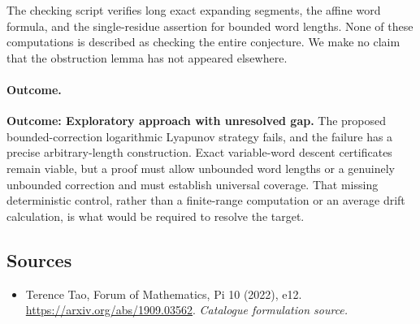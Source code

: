 \documentclass[11pt,a4paper]{article}
\numberwithin{equation}{section}
\begin{document}
The checking script verifies long exact expanding segments, the affine word formula, and the single-residue assertion for bounded word lengths. None of these computations is described as checking the entire conjecture. We make no claim that the obstruction lemma has not appeared elsewhere.

\paragraph{Outcome.}
\textbf{Outcome: Exploratory approach with unresolved gap.}
The proposed bounded-correction logarithmic Lyapunov strategy fails, and the failure has a precise arbitrary-length construction. Exact variable-word descent certificates remain viable, but a proof must allow unbounded word lengths or a genuinely unbounded correction and must establish universal coverage. That missing deterministic control, rather than a finite-range computation or an average drift calculation, is what would be required to resolve the target.

\subsection{Sources}
\begin{itemize}\raggedright
\item[\textnormal{[S1]}]\hypertarget{source:statement:1}{} Terence Tao, Forum of Mathematics, Pi 10 (2022), e12.
\url{https://arxiv.org/abs/1909.03562}.
{\small\textit{Catalogue formulation source.}}
\end{itemize}
\end{document}
